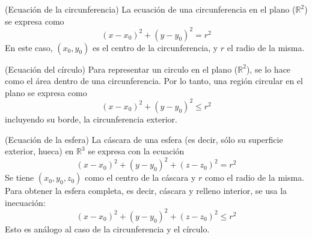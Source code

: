 \begin{definition}
    (Ecuación de la circunferencia) La ecuación de una circunferencia en el plano ($\mathbb{R}^2$)
    se expresa como 
    \begin{equation*}
        (x-x_0)^2+(y-y_0)^2=r^2
    \end{equation*} 
    En este caso, $(x_0,y_0)$ es el centro
    de la circunferencia, y $r$ el radio de la misma.
\end{definition}
\begin{definition}
    (Ecuación del círculo) Para representar un circulo en el plano ($\mathbb{R}^2$), se lo hace como el
    área dentro de una circunferencia. Por lo tanto, una región circular en el plano se expresa
    como
    \begin{equation*}
        (x-x_0)^2+(y-y_0)^2\leq r^2
    \end{equation*} 
    incluyendo su borde, la circunferencia exterior.
\end{definition}
\begin{definition}
    (Ecuación de la esfera) La cáscara de una esfera (es decir, sólo su superficie exterior, hueca) 
    en $\mathbb{R}^3$ se expresa con la ecuación
    \begin{equation*}
        (x-x_0)^2+(y-y_0)^2+(z-z_0)^2=r^2
    \end{equation*}
    Se tiene $(x_0,y_0,z_0)$ como el centro de la cáscara y $r$ como el radio de la misma.
    Para obtener la esfera completa, es decir, cáscara y relleno interior, se usa la inecuación:
    \begin{equation*}
        (x-x_0)^2+(y-y_0)^2+(z-z_0)^2\leq r^2
    \end{equation*}
    Esto es análogo al caso de la circunferencia y el círculo.
\end{definition}
